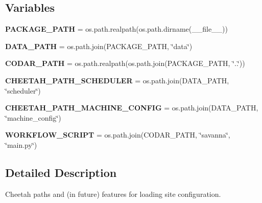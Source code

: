 \subsection*{Variables}
\begin{DoxyCompactItemize}
\item 
\mbox{\label{namespacecodar_1_1cheetah_1_1config_ac3d4a0bd20d4e47ccdcd4ddb6303c1ab}} 
{\bfseries P\+A\+C\+K\+A\+G\+E\+\_\+\+P\+A\+TH} = os.\+path.\+realpath(os.\+path.\+dirname(\+\_\+\+\_\+file\+\_\+\+\_\+))
\item 
\mbox{\label{namespacecodar_1_1cheetah_1_1config_a87c807c2d48e4f9bb206c1d6afde26b5}} 
{\bfseries D\+A\+T\+A\+\_\+\+P\+A\+TH} = os.\+path.\+join(P\+A\+C\+K\+A\+G\+E\+\_\+\+P\+A\+TH, \char`\"{}data\char`\"{})
\item 
\mbox{\label{namespacecodar_1_1cheetah_1_1config_a4ee1eac654271fe0e95d5c67599937a1}} 
{\bfseries C\+O\+D\+A\+R\+\_\+\+P\+A\+TH} = os.\+path.\+realpath(os.\+path.\+join(P\+A\+C\+K\+A\+G\+E\+\_\+\+P\+A\+TH, \char`\"{}..\char`\"{}))
\item 
\mbox{\label{namespacecodar_1_1cheetah_1_1config_ae6c35df28d3aa0b6f7095d2d0c7d3dc8}} 
{\bfseries C\+H\+E\+E\+T\+A\+H\+\_\+\+P\+A\+T\+H\+\_\+\+S\+C\+H\+E\+D\+U\+L\+ER} = os.\+path.\+join(D\+A\+T\+A\+\_\+\+P\+A\+TH, \char`\"{}scheduler\char`\"{})
\item 
\mbox{\label{namespacecodar_1_1cheetah_1_1config_a5d735d6f2f43c555f2e137b38af7fc94}} 
{\bfseries C\+H\+E\+E\+T\+A\+H\+\_\+\+P\+A\+T\+H\+\_\+\+M\+A\+C\+H\+I\+N\+E\+\_\+\+C\+O\+N\+F\+IG} = os.\+path.\+join(D\+A\+T\+A\+\_\+\+P\+A\+TH, \char`\"{}machine\+\_\+config\char`\"{})
\item 
\mbox{\label{namespacecodar_1_1cheetah_1_1config_a069e6b421b6b35917575637b5fe64409}} 
{\bfseries W\+O\+R\+K\+F\+L\+O\+W\+\_\+\+S\+C\+R\+I\+PT} = os.\+path.\+join(C\+O\+D\+A\+R\+\_\+\+P\+A\+TH, \char`\"{}savanna\char`\"{}, \char`\"{}main.\+py\char`\"{})
\end{DoxyCompactItemize}


\subsection{Detailed Description}
\begin{DoxyVerb}Cheetah paths and (in future) features for loading site configuration.
\end{DoxyVerb}
 

